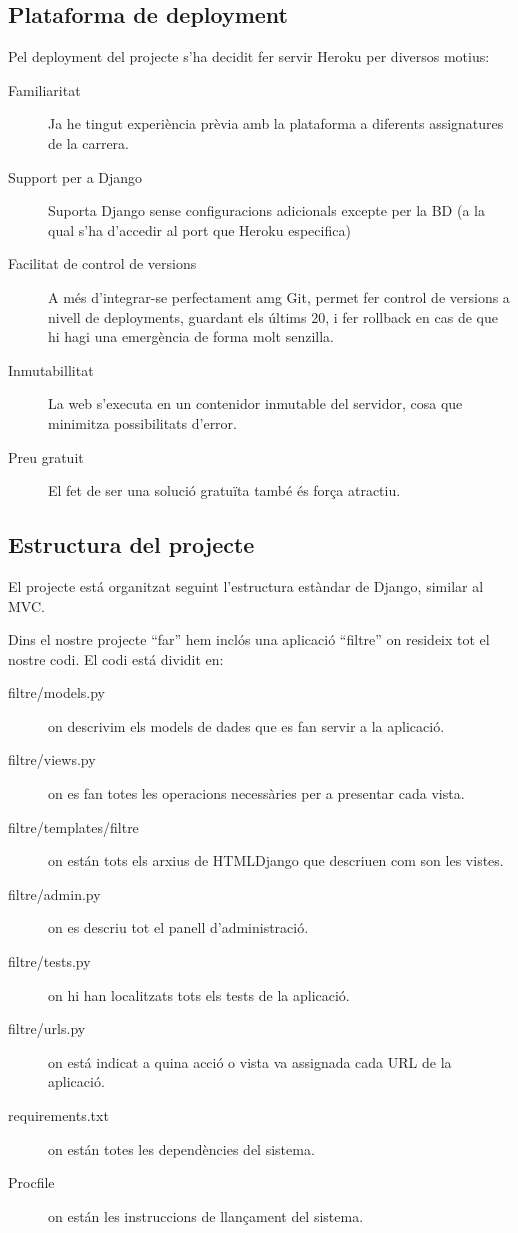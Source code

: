 \documentclass{article}
\begin{document}
\newpage

\subsection{Plataforma de deployment}

Pel deployment del projecte s'ha decidit fer servir Heroku per diversos motius:

\begin{description}
    \item[Familiaritat] Ja he tingut experiència prèvia amb la plataforma a diferents assignatures de la carrera.
    \item[Support per a Django] Suporta Django sense configuracions adicionals excepte per la BD (a la qual s'ha d'accedir al port que Heroku especifica)
    \item[Facilitat de control de versions] A més d'integrar-se perfectament amg Git, permet fer control de versions a nivell de deployments, guardant els últims 20, i fer rollback en cas de que hi hagi una emergència de forma molt senzilla.
    \item[Inmutabillitat] La web s'executa en un contenidor inmutable del servidor, cosa que minimitza possibilitats d'error.
    \item[Preu gratuit] El fet de ser una solució gratuïta també és força atractiu.
\end{description}

\newpage

\subsection{Estructura del projecte}

El projecte está organitzat seguint l'estructura estàndar de Django, similar al MVC\@.

Dins el nostre projecte ``far'' hem inclós una aplicació ``filtre'' on resideix tot el nostre codi. El codi está dividit en:

\begin{description}
    \item[filtre/models.py] on descrivim els models de dades que es fan servir a la aplicació.
    \item[filtre/views.py] on es fan totes les operacions necessàries per a presentar cada vista.
    \item[filtre/templates/filtre] on están tots els arxius de HTMLDjango que descriuen com son les vistes.
    \item[filtre/admin.py] on es descriu tot el panell d'administració.
    \item[filtre/tests.py] on hi han localitzats tots els tests de la aplicació.
    \item[filtre/urls.py] on está indicat a quina acció o vista va assignada cada URL de la aplicació.
    \item[requirements.txt] on están totes les dependències del sistema.
    \item[Procfile] on están les instruccions de llançament del sistema.
\end{description}
\end{document}
